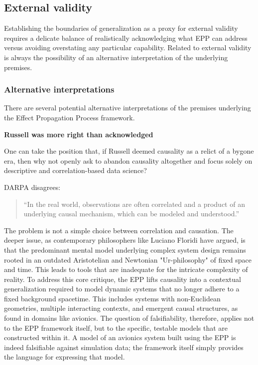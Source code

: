 \documentclass{article}
\begin{document}
\newpage

\subsection{External validity}
\label{sec:validity_external}

Establishing the boundaries of generalization as a proxy for external validity requires a delicate balance of realistically acknowledging what EPP can address versus avoiding overstating  any particular capability. Related to external validity is always the possibility of an alternative interpretation of the underlying premises.

\subsubsection{Alternative interpretations}

There are several potential alternative interpretations of the premises underlying the Effect Propagation Process framework.

\textbf{Russell was more right than acknowledged}

One can take the position that, if Russell deemed causality as a relict of a bygone era, then why not openly ask to abandon causality altogether and focus solely on descriptive and correlation-based data science?

DARPA disagrees\cite{DARPA_ANSR}:

\begin{quote}
    “In the real world, observations are often correlated and a product of an underlying causal mechanism, which can be modeled and understood.”
\end{quote}

The problem is not a simple choice between correlation and causation. The deeper issue, as contemporary philosophers
like Luciano Floridi have argued, is that the predominant mental model underlying complex system design remains rooted
in an outdated Aristotelian and Newtonian "Ur-philosophy" of fixed space and time. This leads to tools that are
inadequate for the intricate complexity of reality. To address this core critique, the EPP lifts causality into a
contextual generalization required to model dynamic systems that no longer adhere to a fixed background spacetime. This
includes systems with non-Euclidean geometries, multiple interacting contexts, and emergent causal structures, as found
in domains like avionics. The question of falsifiability, therefore, applies not to the EPP framework itself, but to the
specific, testable models that are constructed within it. A model of an avionics system built using the EPP is indeed
falsifiable against simulation data; the framework itself simply provides the language for expressing that model.
\end{document}
